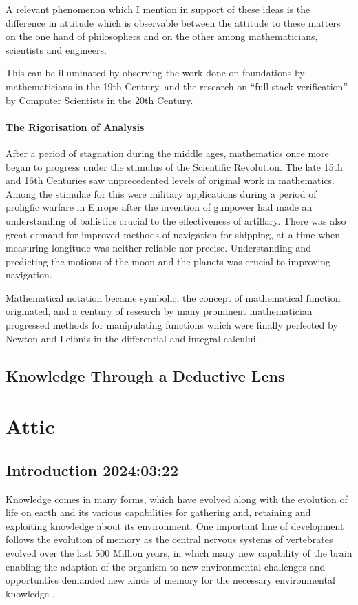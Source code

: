 \documentclass[10pt,titlepage]{book}
\begin{document}
A relevant phenomenon which I mention in support of these ideas is the difference in attitude which is observable between the attitude to these matters on the one hand of philosophers and on the other among mathematicians, scientists and engineers.

This can be illuminated by observing the work done on foundations by mathematicians in the 19th Century, and the research on ``full stack verification'' by Computer Scientists in the 20th Century.

\subsection{The Rigorisation of Analysis}

After a period of stagnation during the middle ages, mathematics once more began to progress under the stimulus of the Scientific Revolution.
The late 15th and 16th Centuries saw unprecedented levels of original work in mathematics.
Among the stimulae for this were military applications during a period of proligfic warfare in Europe after the invention of gunpower had made an understanding of ballistics crucial to the effectiveness of artillary.
There was also great demand for improved methods of navigation for shipping, at a time when measuring longitude was neither reliable nor precise.
Understanding and predicting the motions of the moon and the planets was crucial to improving navigation.

Mathematical notation became symbolic, the concept of mathematical function originated, and a century of research by many prominent mathematician progressed methods for manipulating functions which were finally perfected by Newton and Leibniz in the differential and integral calcului.

\chapter{Knowledge Through a Deductive Lens}\label{ChapKTDL}

\part{Attic}

\chapter{Introduction 2024:03:22}

Knowledge comes in many forms, which have evolved along with the evolution of life on earth and its various capabilities for gathering and, retaining and exploiting knowledge about its environment.
One important line of development follows the evolution of memory as the central nervous systems of vertebrates evolved over the last 500 Million years, in which many new capability of the brain enabling the adaption of the organism to new environmental challenges and opportunties demanded new kinds of memory for the necessary environmental knowledge \cite{murray2017evolution}.
\end{document}
